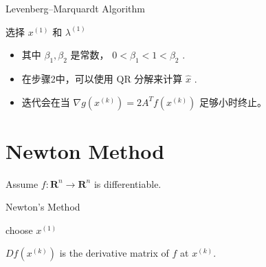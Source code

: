 \begin{algorithm}[htbp]
    \caption{Levenberg–Marquardt Algorithm}
    选择 $ x^{(1)} $ 和 $ \lambda^{(1)} $\;
\end{algorithm}

\begin{itemize}
    \item 其中 $ \beta_{1}, \beta_{2} $ 是常数， $ 0<\beta_{1}<1<\beta_{2} $ .
    \item 在步骤2中，可以使用 $ \mathrm{QR} $ 分解来计算 $ \hat{x} $ .
    \item 迭代会在当 $ \nabla g\left(x^{(k)}\right)=2 A^{T} f\left(x^{(k)}\right) $ 足够小时终止。
\end{itemize}

\section{Newton Method}

\begin{proposition}
    Assume $ f: \mathbf{R}^{n} \rightarrow \mathbf{R}^{n} $ is differentiable.
\end{proposition}



\begin{algorithm}
    \caption{Newton's Method}
     choose $ x^{(1)} $\;
\end{algorithm}



$ D f\left(x^{(k)}\right) $ is the derivative matrix of $ f $ at $ x^{(k)} $. 

